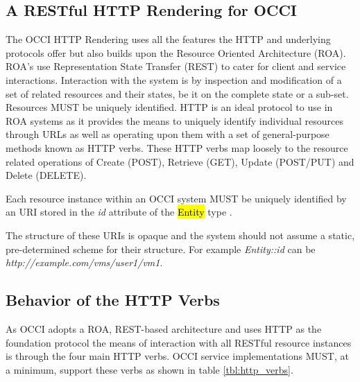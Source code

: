\documentclass[10pt,a4paper]{article}
\begin{document}
\subsection{A RESTful HTTP Rendering for OCCI}
The OCCI HTTP Rendering uses all the features the HTTP and underlying
protocols offer but also builds upon the Resource Oriented
Architecture (ROA). ROA's use Representation State Transfer (REST)
\cite{REST_Fielding} to cater for client and service
interactions. Interaction with the system is by inspection and
modification of a set of related resources and their states, be it on
the complete state or a sub-set. Resources MUST be uniquely
identified. HTTP is an ideal protocol to use in ROA systems as it
provides the means to uniquely identify individual resources through
URLs as well as operating upon them with a set of general-purpose
methods known as HTTP verbs. These HTTP verbs map loosely to the
resource related operations of Create (POST), Retrieve (GET), Update
(POST/PUT) and Delete (DELETE).

Each resource instance within an OCCI system MUST be uniquely
identified by an URI stored in the \emph{id} attribute of the
\hl{Entity} type \cite{occi:core}.

The structure of these URIs is opaque and the system should not assume
a static, pre-determined scheme for their structure. For example
\emph{Entity::id} can be \emph{http://example.com/vms/user1/vm1}.

\subsection{Behavior of the HTTP Verbs}
As OCCI adopts a ROA, REST-based architecture and uses HTTP as the
foundation protocol the means of interaction with all RESTful resource
instances is through the four main HTTP verbs. OCCI service
implementations MUST, at a minimum, support these verbs as shown in
table \ref{tbl:http_verbs}.
\end{document}
